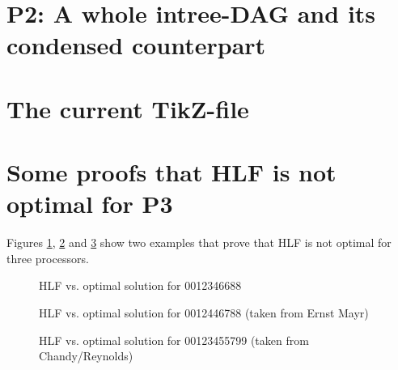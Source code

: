 \documentclass[letter]{report}
\begin{document}
\section{P2: A whole intree-DAG and its condensed counterpart}



\section{The current TikZ-file}



\section{Some proofs that HLF is not optimal for P3}

Figures \ref{fig:hlf-vs-opt-0012346688}, \ref{fig:hlf-vs-opt-0012446788} and \ref{fig:hlf-vs-opt-00123455799} show two examples that prove that HLF is not optimal for three processors.

\begin{figure}[ht]
  \centering
  
  
  \caption{HLF vs. optimal solution for 0012346688}
  \label{fig:hlf-vs-opt-0012346688}
\end{figure}

\begin{figure}[ht]
  \centering
  
  
  \caption{HLF vs. optimal solution for 0012446788 (taken from Ernst Mayr)}
  \label{fig:hlf-vs-opt-0012446788}
\end{figure}

\begin{figure}[ht]
  \centering
  
  
  \caption{HLF vs. optimal solution for 00123455799 (taken from Chandy/Reynolds)}
  \label{fig:hlf-vs-opt-00123455799}
\end{figure}
\end{document}
